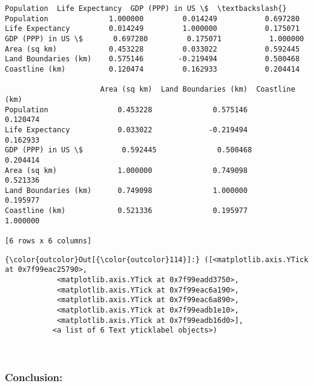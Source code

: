 \documentclass{article}
\begin{document}
    \begin{Verbatim}[commandchars=\\\{\}]
Population  Life Expectancy  GDP (PPP) in US \$  \textbackslash{}
Population              1.000000         0.014249           0.697280   
Life Expectancy         0.014249         1.000000           0.175071   
GDP (PPP) in US \$       0.697280         0.175071           1.000000   
Area (sq km)            0.453228         0.033022           0.592445   
Land Boundaries (km)    0.575146        -0.219494           0.500468   
Coastline (km)          0.120474         0.162933           0.204414   

                      Area (sq km)  Land Boundaries (km)  Coastline (km)  
Population                0.453228              0.575146        0.120474  
Life Expectancy           0.033022             -0.219494        0.162933  
GDP (PPP) in US \$         0.592445              0.500468        0.204414  
Area (sq km)              1.000000              0.749098        0.521336  
Land Boundaries (km)      0.749098              1.000000        0.195977  
Coastline (km)            0.521336              0.195977        1.000000  

[6 rows x 6 columns]
    \end{Verbatim}

            \begin{Verbatim}[commandchars=\\\{\}]
{\color{outcolor}Out[{\color{outcolor}114}]:} ([<matplotlib.axis.YTick at 0x7f99eac25790>,
            <matplotlib.axis.YTick at 0x7f99eadd3750>,
            <matplotlib.axis.YTick at 0x7f99eac6a190>,
            <matplotlib.axis.YTick at 0x7f99eac6a890>,
            <matplotlib.axis.YTick at 0x7f99eadb1e10>,
            <matplotlib.axis.YTick at 0x7f99eadb16d0>],
           <a list of 6 Text yticklabel objects>)
\end{Verbatim}
        
    \begin{center}
    \end{center}
    { \hspace*{\fill} \\}
    
    \subsubsection{Conclusion:}\label{conclusion}
\end{document}
